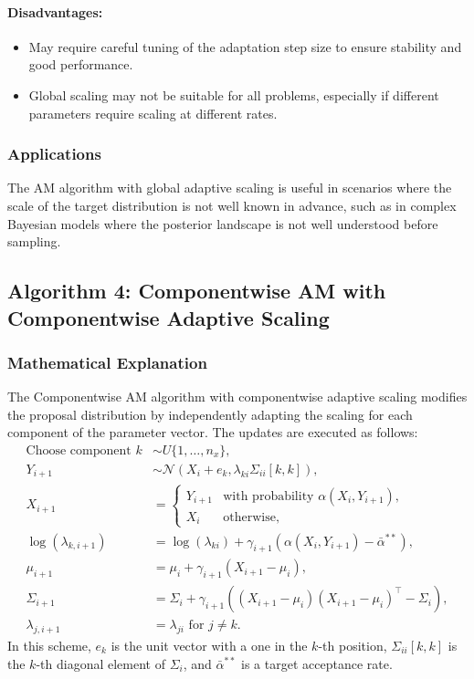 \documentclass{article}
\begin{document}
\paragraph{Disadvantages:}
\begin{itemize}
    \item May require careful tuning of the adaptation step size to ensure stability and good performance.
    \item Global scaling may not be suitable for all problems, especially if different parameters require scaling at different rates.
\end{itemize}

\subsubsection{Applications}
The AM algorithm with global adaptive scaling is useful in scenarios where the scale of the target distribution is not well known in advance, such as in complex Bayesian models where the posterior landscape is not well understood before sampling.

\subsection{Algorithm 4: Componentwise AM with Componentwise Adaptive Scaling}

\subsubsection{Mathematical Explanation}
The Componentwise AM algorithm with componentwise adaptive scaling modifies the proposal distribution by independently adapting the scaling for each component of the parameter vector. The updates are executed as follows:
\begin{align*}
\text{Choose component } k &\sim U\{1, \dots, n_x\}, \\
Y_{i+1} &\sim \mathcal{N}(X_i + e_k, \lambda_{ki} \Sigma_{ii}[k,k]), \\
X_{i+1} &= 
\begin{cases} 
Y_{i+1} & \text{with probability } \alpha(X_i, Y_{i+1}), \\
X_i & \text{otherwise},
\end{cases} \\
\log(\lambda_{k,i+1}) &= \log(\lambda_{ki}) + \gamma_{i+1}(\alpha(X_i, Y_{i+1}) - \bar{\alpha}^{\ast\ast}), \\
\mu_{i+1} &= \mu_i + \gamma_{i+1}(X_{i+1} - \mu_i), \\
\Sigma_{i+1} &= \Sigma_i + \gamma_{i+1}((X_{i+1} - \mu_i)(X_{i+1} - \mu_i)^\top - \Sigma_i), \\
\lambda_{j,i+1} &= \lambda_{ji} \text{ for } j \neq k.
\end{align*}
In this scheme, \( e_k \) is the unit vector with a one in the \( k \)-th position, \( \Sigma_{ii}[k,k] \) is the \( k \)-th diagonal element of \( \Sigma_i \), and \( \bar{\alpha}^{\ast\ast} \) is a target acceptance rate.
\end{document}
